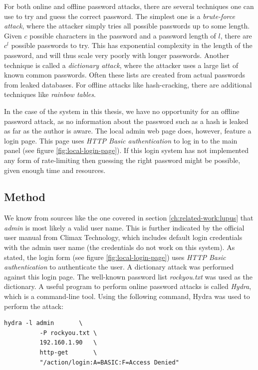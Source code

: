 For both online and offline password attacks, there are several techniques one can use to try and guess the correct password. The simplest one is a \textit{brute-force attack}, where the attacker simply tries all possible passwords up to some length. Given $c$ possible characters in the password and a password length of $l$, there are $c^l$ possible passwords to try. This has exponential complexity in the length of the password, and will thus scale very poorly with longer passwords. Another technique is called a \textit{dictionary attack}, where the attacker uses a large list of known common passwords. Often these lists are created from actual passwords from leaked databases. For offline attacks like hash-cracking, there are additional techniques like \textit{rainbow tables}.

In the case of the system in this thesis, we have no opportunity for an offline password attack, as no information about the password such as a hash is leaked as far as the author is aware. The local admin web page does, however, feature a login page. This page uses \textit{HTTP Basic authentication} to log in to the main panel (see figure \ref{fig:local-login-page}). If this login system has not implemented any form of rate-limiting then guessing the right password might be possible, given enough time and resources.

\subsection{Method}
We know from sources like the one covered in section \ref{ch:related-work:lupus} that \textit{admin} is most likely a valid user name. This is further indicated by the official user manual from Climax Technology, which includes default login credentials with the admin user name (the credentials do not work on this system). As stated, the login form (see figure \ref{fig:local-login-page}) uses \textit{HTTP Basic authentication} to authenticate the user. A dictionary attack was performed against this login page. The well-known password list \textit{rockyou.txt} was used as the dictionary. A useful program to perform online password attacks is called \textit{Hydra}, which is a command-line tool. Using the following command, Hydra was used to perform the attack:
\begin{lstlisting}[frame=tb]
    hydra -l admin       \
          -P rockyou.txt \
          192.160.1.90   \
          http-get       \
          "/action/login:A=BASIC:F=Access Denied"
\end{lstlisting}

